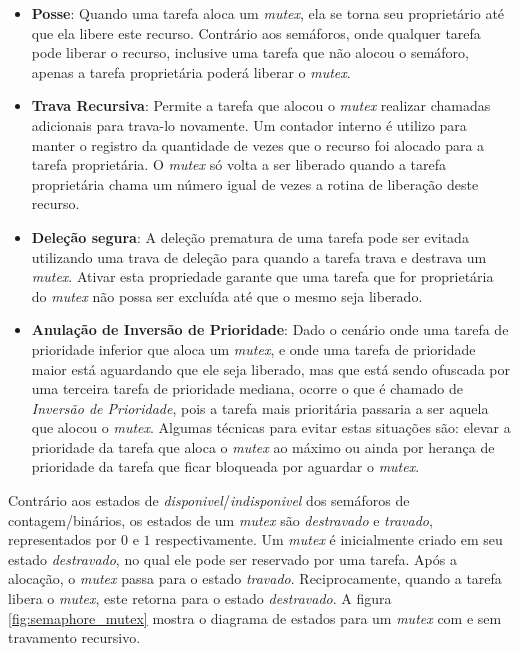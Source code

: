 \begin{itemize}
	\item \textbf{Posse}: Quando uma tarefa aloca um \emph{mutex}, ela se torna seu proprietário até que ela libere este recurso. Contrário aos semáforos, onde qualquer tarefa pode liberar o recurso, inclusive uma tarefa que não alocou o semáforo, apenas a tarefa proprietária poderá liberar o \emph{mutex}.
	\item \textbf{Trava Recursiva}: Permite a tarefa que alocou o \emph{mutex} realizar chamadas adicionais para trava-lo novamente. Um contador interno é utilizo para manter o registro da quantidade de vezes que o recurso foi alocado para a tarefa proprietária. O \emph{mutex} só volta a ser liberado quando a tarefa proprietária chama um número igual de vezes a rotina de liberação deste recurso.
	\item \textbf{Deleção segura}: A deleção prematura de uma tarefa pode ser evitada utilizando uma trava de deleção para quando a tarefa trava e destrava um \emph{mutex}. Ativar esta propriedade garante que uma tarefa que for proprietária do \emph{mutex} não possa ser excluída até que o mesmo seja liberado.
	\item \textbf{Anulação de Inversão de Prioridade}: Dado o cenário onde uma tarefa de prioridade inferior que aloca um \emph{mutex}, e onde uma tarefa de prioridade maior está aguardando que ele seja liberado, mas que está sendo ofuscada por uma terceira tarefa de prioridade mediana, ocorre o que é chamado de \emph{Inversão de Prioridade}, pois a tarefa mais prioritária passaria a ser aquela que alocou o \emph{mutex}. Algumas técnicas para evitar estas situações são: elevar a prioridade da tarefa que aloca o \emph{mutex} ao máximo ou ainda por herança de prioridade da tarefa que ficar bloqueada por aguardar o \emph{mutex}.
\end{itemize}

Contrário aos estados de \emph{disponivel}/\emph{indisponivel} dos semáforos de contagem/binários, os estados de um \emph{mutex} são \emph{destravado} e \emph{travado}, representados por $0$ e $1$ respectivamente. Um \emph{mutex} é inicialmente criado em seu estado \emph{destravado}, no qual ele pode ser reservado por uma tarefa. Após a alocação, o \emph{mutex} passa para o estado \emph{travado}. Reciprocamente, quando a tarefa libera o \emph{mutex}, este retorna para o estado \emph{destravado}. A figura \ref{fig:semaphore_mutex} mostra o diagrama de estados para um \emph{mutex} com e sem travamento recursivo.

